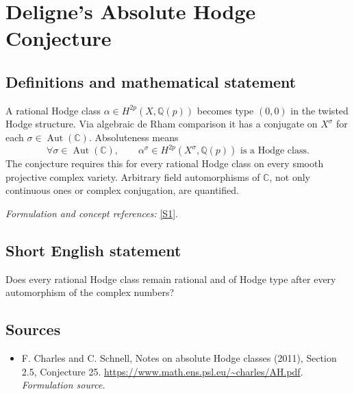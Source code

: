 \documentclass[11pt]{article}
\begin{document}
\section*{\texorpdfstring{Deligne's Absolute Hodge Conjecture}{Deligne's Absolute Hodge Conjecture}}\label{30006725}
\subsection{Definitions and mathematical statement}
A rational Hodge class $\alpha\in H^{2p}(X,{\mathbb{Q}}(p))$ becomes type $(0,0)$ in the twisted Hodge structure. Via algebraic de Rham comparison it has a conjugate on $X^\sigma$ for each $\sigma\in\operatorname{Aut}({\mathbb{C}})$. Absoluteness means
\[
 \forall\sigma\in\operatorname{Aut}({\mathbb{C}}),\qquad
 \alpha^\sigma\in H^{2p}(X^\sigma,{\mathbb{Q}}(p))\text{ is a Hodge class}.
\]
The conjecture requires this for every rational Hodge class on every smooth projective complex variety. Arbitrary field automorphisms of ${\mathbb{C}}$, not only continuous ones or complex conjugation, are quantified.
\par\smallskip\textit{Formulation and concept references:} \href{https://www.math.ens.psl.eu/~charles/AH.pdf}{[S1]}.

\subsection{Short English statement}
Does every rational Hodge class remain rational and of Hodge type after every automorphism of the complex numbers?
\subsection{Sources}
\begin{itemize}
\item[S1]F. Charles and C. Schnell, Notes on absolute Hodge classes (2011), Section 2.5, Conjecture 25.
\url{https://www.math.ens.psl.eu/~charles/AH.pdf}.
\textit{Formulation source.}
\end{itemize}
\end{document}
